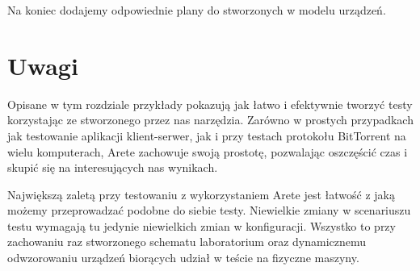 \documentclass[00-praca-magisterska.tex]{subfiles}
\begin{document}
Na koniec dodajemy odpowiednie plany do stworzonych w modelu urządzeń.



\section{Uwagi}
\label{przyklady-podsumowanie}

Opisane w tym rozdziale przykłady pokazują jak łatwo i efektywnie tworzyć
testy korzystając ze stworzonego przez nas narzędzia. Zarówno w prostych 
przypadkach jak testowanie aplikacji klient-serwer, jak i przy testach 
protokołu BitTorrent na wielu komputerach, Arete zachowuje swoją prostotę, 
pozwalając oszczęścić czas i skupić się na interesujących nas wynikach.

Największą zaletą przy testowaniu z wykorzystaniem Arete jest łatwość z 
jaką możemy przeprowadzać podobne do siebie testy. Niewielkie zmiany w 
scenariuszu testu wymagają tu jedynie niewielkich zmian w konfiguracji. 
Wszystko to przy zachowaniu raz stworzonego schematu laboratorium oraz 
dynamicznemu odwzorowaniu urządzeń biorących udział w teście na fizyczne 
maszyny.
\end{document}
